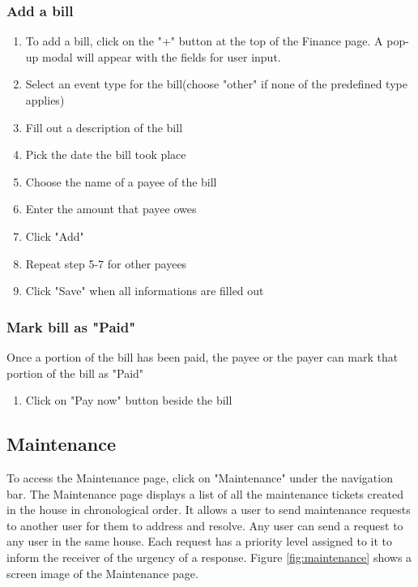 \documentclass[12pt]{article}
\begin{document}
    \subsubsection{Add a bill}
    \begin{enumerate}
        \item To add a bill, click on the "+" button at the top of the Finance page. A pop-up modal will appear with the fields for user input.
        \item Select an event type for the bill(choose "other" if none of the predefined type applies)
        \item Fill out a description of the bill
        \item Pick the date the bill took place
        \item Choose the name of a payee of the bill
        \item Enter the amount that payee owes
        \item Click "Add"
        \item Repeat step 5-7 for other payees
        \item Click "Save" when all informations are filled out
    \end{enumerate}
    
    \subsubsection{Mark bill as "Paid"}
    Once a portion of the bill has been paid, the payee or the payer can mark that portion of the bill as "Paid" 
    \begin{enumerate}
        \item Click on "Pay now" button beside the bill
    \end{enumerate}
    
    
    
    
    \subsection{Maintenance}
    To access the Maintenance page, click on "Maintenance" under the navigation bar. The Maintenance page displays a list of all the maintenance tickets created in the house in chronological order. It  allows a user to send maintenance requests to another user for them to address and resolve. Any user can send a request to any user in the same house. Each request has a priority level assigned to it to inform the receiver of the urgency of a response. Figure \ref{fig:maintenance} shows a screen image of the Maintenance page.
    
\end{document}
